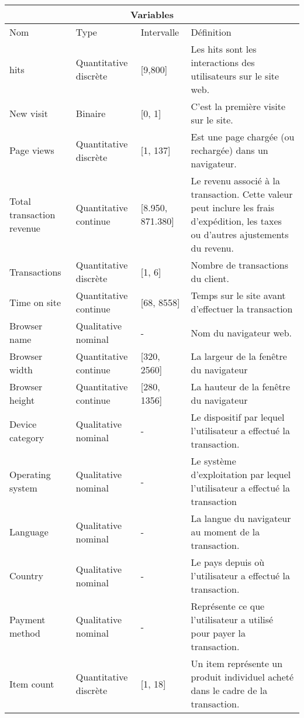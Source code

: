 \begin{center}
\begin{longtable}{ |p{3cm}||p{3cm}|p{2cm}|p{5cm}|  }
 \hline
 \multicolumn{4}{|c|}{Variables} \\
 \hline
 Nom & Type &Intervalle&Définition\\
 \hline
 hits   & Quantitative discrète  &[9,800]&  Les hits sont les interactions des utilisateurs sur le site web.\\
New visit &   Binaire   & [0, 1]   & C'est la première visite sur le site.\\
Page views&   Quantitative discrète  & [1, 137]   &Est une page chargée (ou rechargée) dans un navigateur.\\
Total transaction revenue & Quantitative continue  &[8.950, 871.380]&  Le revenu associé à la transaction. Cette valeur peut inclure les frais d'expédition, les taxes ou d'autres ajustements du revenu.\\
Transactions    &Quantitative discrète  & [1, 6] &  Nombre de transactions du client.\\
Time on site&   Quantitative continue  & [68, 8558]& Temps sur le site avant d'effectuer la transaction \\
 Browser name& Qualitative nominal  & -   & Nom du navigateur web.\\
 Browser width& Quantitative continue  & [320, 2560]& La largeur de la fenêtre du navigateur \\
 Browser height& Quantitative continue  & [280, 1356]& La hauteur de la fenêtre du navigateur\\
 Device category& Qualitative nominal   & -&Le dispositif par lequel l'utilisateur a effectué la transaction.\\
 Operating system& Qualitative nominal  & -&Le système d'exploitation par lequel l'utilisateur a effectué la transaction\\
 Language& Qualitative nominal  & -& La langue du navigateur au moment de la transaction.\\
 Country& Qualitative nominal   & -& Le pays depuis où l'utilisateur a effectué la transaction.\\
 Payment method& Qualitative nominal   & -&  Représente  ce que l'utilisateur a utilisé pour payer la transaction.\\
 Item count& Quantitative discrète  & [1, 18]& Un item représente un produit individuel acheté dans le cadre de la transaction. \\
 \hline
\end{longtable}
\end{center}

